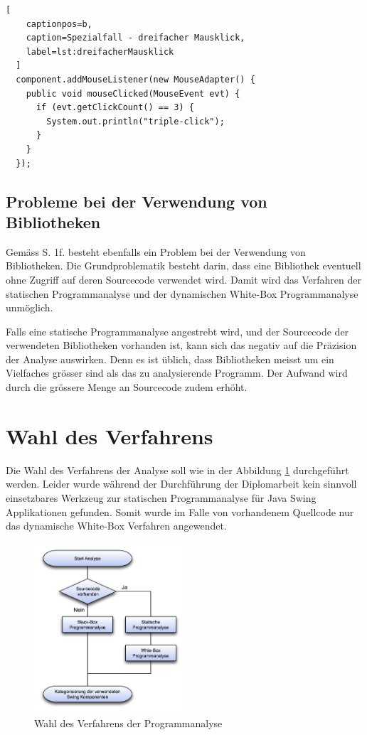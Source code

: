   \begin{lstlisting}[
    captionpos=b,
    caption=Spezialfall - dreifacher Mausklick,
    label=lst:dreifacherMausklick
  ]
  component.addMouseListener(new MouseAdapter() {
    public void mouseClicked(MouseEvent evt) {
      if (evt.getClickCount() == 3) {
        System.out.println("triple-click");
      }
    }
  });
  \end{lstlisting}
  
  \subsection{Probleme bei der Verwendung von Bibliotheken}
  
  Gemäss \cite{GUIAnalysenUndBibliotheken} S. 1f. besteht ebenfalls ein Problem
  bei der Verwendung von Bibliotheken. Die Grundproblematik besteht darin,
  dass eine Bibliothek eventuell ohne Zugriff auf deren Sourcecode verwendet
  wird. Damit wird das Verfahren der statischen Programmanalyse und der
  dynamischen White-Box Programmanalyse unmöglich.
  
  Falls eine statische Programmanalyse angestrebt wird, und der Sourcecode der
  verwendeten Bibliotheken vorhanden ist, kann sich das negativ auf die
  Präzision der Analyse auswirken. Denn es ist üblich, dass Bibliotheken
  meisst um ein Vielfaches grösser sind als das zu analysierende Programm. Der
  Aufwand wird durch die grössere Menge an Sourcecode zudem erhöht.
  
  \section{Wahl des Verfahrens}
  
  Die Wahl des Verfahrens der Analyse soll wie in der Abbildung
  \ref{img:guiAnalyse} durchgeführt werden. Leider wurde während der
  Durchführung der Diplomarbeit kein sinnvoll einsetzbares Werkzeug zur
  statischen Programmanalyse für Java Swing Applikationen gefunden. Somit wurde
  im Falle von vorhandenem Quellcode nur das dynamische White-Box Verfahren
  angewendet.
  
  \begin{figure}[ht]
    \begin{center}
      \includegraphics[width=0.5\textwidth]{./image/guiAnalyse.png}
      \caption{Wahl des Verfahrens der Programmanalyse}
      \label{img:guiAnalyse}
    \end{center}
  \end{figure}
  
